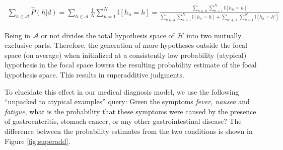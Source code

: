 \begin{align}
\sum_{h \in \mathcal{A}} \hat{P}(h | d) = 
\sum_{h \in \mathcal{A}}\frac{1}{N}\sum_{n=1}^N \mathbb{I}[h_n=h] = 
\frac{\sum_{h \in \mathcal{A}} \sum_{n=1}^N \mathbb{I}[h_n=h]}
{\sum_{h \in \mathcal{A}} \sum_{n=1}^N \mathbb{I}[h_n=h] + \sum_{h' \notin \mathcal{A}} \sum_{n=1}^N \mathbb{I}[h_n=h']}
\end{align}

Being in $\mathcal{A}$ or not divides the total hypothesis space of $\mathcal{H}$ into two mutually exclusive parts. Therefore, the generation of more hypotheses outside the focal space (on average) when initialized at a consistently low probability (atypical) hypothesis in the focal space lowers the resulting probability estimate of the focal hypothesis space. This results in superadditive judgments.
 
To elucidate this effect in our medical diagnosis model, we use the following ``unpacked to atypical examples'' query: Given the symptoms \emph{fever, nausea} and \emph{fatigue}, what is the probability that these symptoms were caused by the presence of gastroenteritis, stomach cancer, or any other gastrointestinal disease? The difference between the probability estimates from the two conditions is shown in Figure \ref{fig:superadd}.

